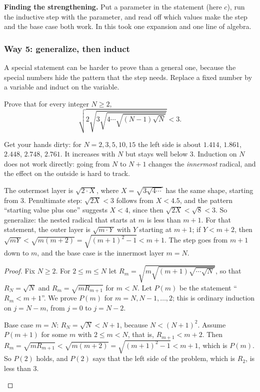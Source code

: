 \documentclass[10pt]{scrartcl}
\begin{document}
\begin{shortcuts}
  \ii \textbf{Finding the strengthening.} Put a parameter in the statement (here $c$), run the inductive step with the parameter, and read off which values make the step and the base case both work. In  this took one expansion and one line of algebra.
\end{shortcuts}

\subsubsection*{Way 5: generalize, then induct}
A special statement can be harder to prove than a general one, because the special numbers hide the pattern that the step needs. Replace a fixed number by a variable and induct on the variable.

\begin{example*}
  Prove that for every integer $N \geq 2$,
  \[ \sqrt{2\sqrt{3\sqrt{4 \cdots \sqrt{(N-1)\sqrt N}}}} < 3. \]
\end{example*}

Get your hands dirty: for $N = 2, 3, 5, 10, 15$ the left side is about $1.414$, $1.861$, $2.448$, $2.748$, $2.761$. It increases with $N$ but stays well below $3$. Induction on $N$ does not work directly: going from $N$ to $N+1$ changes the \emph{innermost} radical, and the effect on the outside is hard to track.

\begin{ideabox}
  The outermost layer is $\sqrt{2 \cdot X}$, where $X = \sqrt{3\sqrt{4\cdots}}$ has the same shape, starting from $3$. Penultimate step: $\sqrt{2X} < 3$ follows from $X < 4.5$, and the pattern ``starting value plus one'' suggests $X < 4$, since then $\sqrt{2X} < \sqrt 8 < 3$. So generalize: the nested radical that starts at $m$ is less than $m + 1$. For that statement, the outer layer is $\sqrt{m \cdot Y}$ with $Y$ starting at $m+1$; if $Y < m + 2$, then $\sqrt{mY} < \sqrt{m(m+2)} = \sqrt{(m+1)^2 - 1} < m+1$. The step goes from $m+1$ down to $m$, and the base case is the innermost layer $m = N$.
\end{ideabox}

\begin{proof}
  Fix $N \geq 2$. For $2 \le m \le N$ let $R_m = \sqrt{m\sqrt{(m+1)\sqrt{\cdots\sqrt N}}}$, so that $R_N = \sqrt N$ and $R_m = \sqrt{m R_{m+1}}$ for $m < N$. Let $P(m)$ be the statement ``$R_m < m + 1$''. We prove $P(m)$ for $m = N, N-1, \dots, 2$; this is ordinary induction on $j = N - m$, from $j = 0$ to $j = N - 2$.
  \begin{steps}
    \ii Base case $m = N$: $R_N = \sqrt N < N + 1$, because $N < (N+1)^2$.
    \ii Assume $P(m+1)$ for some $m$ with $2 \le m < N$, that is, $R_{m+1} < m + 2$.
    \ii Then $R_m = \sqrt{m R_{m+1}} < \sqrt{m(m+2)} = \sqrt{(m+1)^2 - 1} < m + 1$, which is $P(m)$.
    \ii So $P(2)$ holds, and $P(2)$ says that the left side of the problem, which is $R_2$, is less than $3$.
  \end{steps}
\end{proof}
\end{document}
